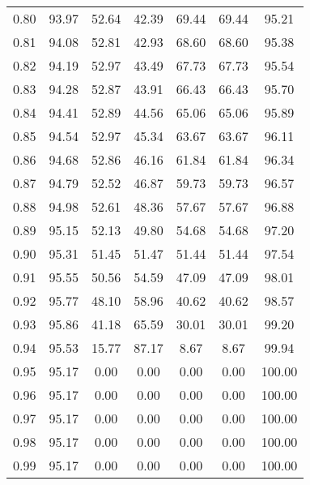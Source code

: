 \begin{tabular}{|c|c|c|c|c|c|c|}
      0.80 &     93.97 &     52.64 &      42.39 &   69.44 &      69.44 &         95.21 \\
      0.81 &     94.08 &     52.81 &      42.93 &   68.60 &      68.60 &         95.38 \\
      0.82 &     94.19 &     52.97 &      43.49 &   67.73 &      67.73 &         95.54 \\
      0.83 &     94.28 &     52.87 &      43.91 &   66.43 &      66.43 &         95.70 \\
      0.84 &     94.41 &     52.89 &      44.56 &   65.06 &      65.06 &         95.89 \\
      0.85 &     94.54 &     52.97 &      45.34 &   63.67 &      63.67 &         96.11 \\
      0.86 &     94.68 &     52.86 &      46.16 &   61.84 &      61.84 &         96.34 \\
      0.87 &     94.79 &     52.52 &      46.87 &   59.73 &      59.73 &         96.57 \\
      0.88 &     94.98 &     52.61 &      48.36 &   57.67 &      57.67 &         96.88 \\
      0.89 &     95.15 &     52.13 &      49.80 &   54.68 &      54.68 &         97.20 \\
      0.90 &     95.31 &     51.45 &      51.47 &   51.44 &      51.44 &         97.54 \\
      0.91 &     95.55 &     50.56 &      54.59 &   47.09 &      47.09 &         98.01 \\
      0.92 &     95.77 &     48.10 &      58.96 &   40.62 &      40.62 &         98.57 \\
      0.93 &     95.86 &     41.18 &      65.59 &   30.01 &      30.01 &         99.20 \\
      0.94 &     95.53 &     15.77 &      87.17 &    8.67 &       8.67 &         99.94 \\
      0.95 &     95.17 &      0.00 &       0.00 &    0.00 &       0.00 &        100.00 \\
      0.96 &     95.17 &      0.00 &       0.00 &    0.00 &       0.00 &        100.00 \\
      0.97 &     95.17 &      0.00 &       0.00 &    0.00 &       0.00 &        100.00 \\
      0.98 &     95.17 &      0.00 &       0.00 &    0.00 &       0.00 &        100.00 \\
      0.99 &     95.17 &      0.00 &       0.00 &    0.00 &       0.00 &        100.00 \\
\bottomrule
\end{tabular}

